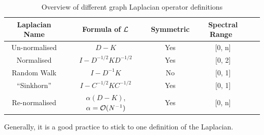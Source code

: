 \begin{table}[!htbp]
 \centering
 \begin{tabular}{|c|c|c|c|c|}
  \hline
  Laplacian Name & Formula of \(\operatorname{\mathcal{L}}\) & Symmetric & Spectral Range \\
  \hline
  Un-normalised & \(D - K\) & Yes & [0, n] \\
  \hline
  Normalised & \(I - D^{-1/2}KD^{-1/2}\) & Yes & [0, 2] \\
  \hline
  Random Walk & \(I - D^{-1}K\) & No & [0, 1] \\
  \hline
  ``Sinkhorn'' \cite{milanfar_symmetrizing_2013} & \(I - C^{-1/2}KC^{-1/2}\) & Yes & [0, 1] \\
  \hline
  Re-normalised \cite{milanfar_new_2016} & \(\alpha(D - K)\), \(\alpha = \operatorname{\mathcal{O}}(N^{-1})\) & Yes & [0, n] \\
  \hline
 \end{tabular}
 \caption{Overview of different graph Laplacian operator definitions}
 \label{table:laplacians}
\end{table}
Generally, it is a good practice to stick to one definition of the Laplacian.
